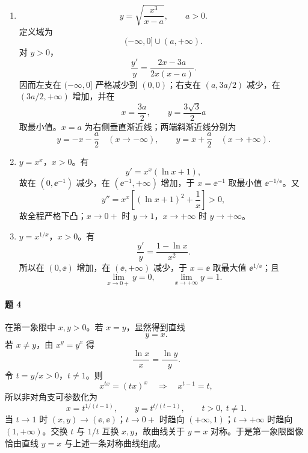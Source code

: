 \begin{xsolution}
\begin{enumerate}[label=(\arabic*)]
  \item
  \[
    y=\sqrt{\frac{x^3}{x-a}},\qquad a>0.
  \]
  定义域为
  \[
    (-\infty,0]\cup(a,+\infty).
  \]
  对 $y>0$，
  \[
    \frac{y'}y=\frac{2x-3a}{2x(x-a)}.
  \]
  因而左支在 $(-\infty,0]$ 严格减少到 $(0,0)$；右支在 $(a,3a/2)$ 减少，在 $(3a/2,+\infty)$ 增加，并在
  \[
    x=\frac{3a}{2},\qquad y=\frac{3\sqrt3}{2}a
  \]
  取最小值。$x=a$ 为右侧垂直渐近线；两端斜渐近线分别为
  \[
    y=-x-\frac a2\quad(x\to-\infty),
    \qquad
    y=x+\frac a2\quad(x\to+\infty).
  \]

  \item $y=x^x$，$x>0$。有
  \[
    y'=x^x(\ln x+1),
  \]
  故在 $(0,\ee^{-1})$ 减少，在 $(\ee^{-1},+\infty)$ 增加，于 $x=\ee^{-1}$ 取最小值 $\ee^{-1/\ee}$。又
  \[
    y''=x^x\left[(\ln x+1)^2+\frac1x\right]>0,
  \]
  故全程严格下凸；$x\to0+$ 时 $y\to1$，$x\to+\infty$ 时 $y\to+\infty$。

  \item $y=x^{1/x}$，$x>0$。有
  \[
    \frac{y'}y=\frac{1-\ln x}{x^2}.
  \]
  所以在 $(0,\ee)$ 增加，在 $(\ee,+\infty)$ 减少，于 $x=\ee$ 取最大值 $\ee^{1/\ee}$；且
  \[
    \lim_{x\to0+}y=0,
    \qquad
    \lim_{x\to+\infty}y=1.
  \]
\end{enumerate}
\end{xsolution}

\paragraph{题 4}
\begin{xsolution}
在第一象限中 $x,y>0$。若 $x=y$，显然得到直线
\[
  y=x.
\]
若 $x\ne y$，由 $x^y=y^x$ 得
\[
  \frac{\ln x}{x}=\frac{\ln y}{y}.
\]
令 $t=y/x>0$，$t\ne1$。则
\[
  x^{tx}=(tx)^x
  \quad\Longrightarrow\quad
  x^{t-1}=t,
\]
所以非对角支可参数化为
\[
  \boxed{x=t^{1/(t-1)},\qquad y=t^{t/(t-1)},\qquad t>0,\ t\ne1.}
\]
当 $t\to1$ 时 $(x,y)\to(\ee,\ee)$；$t\to0+$ 时趋向 $(+\infty,1)$；$t\to+\infty$ 时趋向 $(1,+\infty)$。交换 $t$ 与 $1/t$ 互换 $x,y$，故曲线关于 $y=x$ 对称。于是第一象限图像恰由直线 $y=x$ 与上述一条对称曲线组成。
\end{xsolution}

